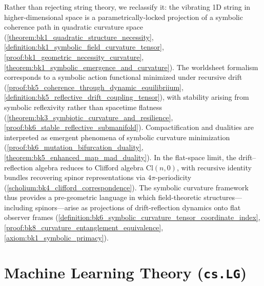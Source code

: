Rather than rejecting string theory, we reclassify it: the vibrating 1D string in higher-dimensional space is a parametrically-locked projection of a symbolic coherence path in quadratic curvature space (\ref{theorem:bk1_quadratic_structure_necessity}, \ref{definition:bk1_symbolic_field_curvature_tensor}, \ref{proof:bk1_geometric_necessity_curvature}, \ref{theorem:bk1_symbolic_emergence_and_curvature}). The worldsheet formalism corresponds to a symbolic action functional minimized under recursive drift (\ref{proof:bk5_coherence_through_dynamic_equilibriium}, \ref{definition:bk5_reflective_drift_coupling_tensor}), with stability arising from symbolic reflexivity rather than spacetime flatness (\ref{theorem:bk3_symbiotic_curvature_and_resilience}, \ref{proof:bk6_stable_reflective_submanifold}). Compactification and dualities are interpreted as emergent phenomena of symbolic curvature minimization (\ref{proof:bk6_mutation_bifurcation_duality}, \ref{theorem:bk5_enhanced_map_mad_duality}). In the flat-space limit, the drift--reflection algebra reduces to Clifford algebra $\mathrm{Cl}(n,0)$, with recursive identity bundles recovering spinor representations via $4\pi$-periodicity (\ref{scholium:bk4_clifford_correspondence}). The symbolic curvature framework thus provides a pre-geometric language in which field-theoretic structures---including spinors---arise as projections of drift-reflection dynamics onto flat observer frames (\ref{definition:bk6_symbolic_curvature_tensor_coordinate_index}, \ref{proof:bk8_curvature_entanglement_equivalence}, \ref{axiom:bk1_symbolic_primacy}).

\section*{Machine Learning Theory (\texttt{cs.LG})}
\label{abs:ml}

